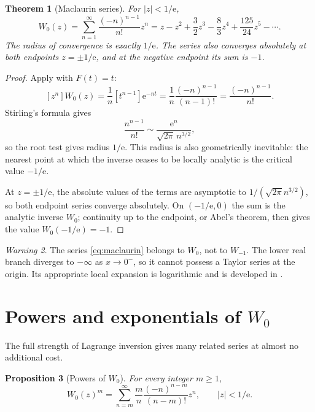 \documentclass[11pt,openany]{book}
\newcommand{\e}{\mathrm{e}}
\newcommand{\Wzero}{W_0}
\newcommand{\abs}[1]{\left|#1\right|}
\theoremstyle{plain}
\newtheorem{theorem}{Theorem}[chapter]
\newtheorem{proposition}[theorem]{Proposition}
\theoremstyle{definition}
\theoremstyle{remark}
\newtheorem{warning}[theorem]{Warning}
\begin{document}
\begin{theorem}[Maclaurin series]\label{thm:maclaurin}
For \(\abs z<1/\e\),
\begin{equation}\label{eq:maclaurin}
 \Wzero(z)=\sum_{n=1}^{\infty}
       \frac{(-n)^{n-1}}{n!}z^n
 =z-z^2+\frac32z^3-\frac83z^4
  +\frac{125}{24}z^5-\cdots.
\end{equation}
The radius of convergence is exactly \(1/\e\).  The series also converges
absolutely at both endpoints \(z=\pm1/\e\), and at the negative endpoint its
sum is \(-1\).
\end{theorem}

\begin{proof}
Apply  with \(F(t)=t\):
\[
 [z^n]\Wzero(z)
 =\frac1n[t^{n-1}]\e^{-nt}
 =\frac1n\frac{(-n)^{n-1}}{(n-1)!}
 =\frac{(-n)^{n-1}}{n!}.
\]
Stirling's formula gives
\[
 \frac{n^{n-1}}{n!}
 \sim\frac{\e^n}{\sqrt{2\pi}\,n^{3/2}},
\]
so the root test gives radius \(1/\e\).  This radius is also geometrically
inevitable: the nearest point at which the inverse ceases to be locally
analytic is the critical value \(-1/\e\).

At \(z=\pm1/\e\), the absolute values of the terms are asymptotic to
\(1/(\sqrt{2\pi}n^{3/2})\), so both endpoint series converge absolutely.  On
\((-1/\e,0)\) the sum is the analytic inverse \(W_0\); continuity up to the
endpoint, or Abel's theorem, then gives the value \(W_0(-1/\e)=-1\).
\end{proof}

\begin{warning}
The series \eqref{eq:maclaurin} belongs to \(W_0\), not to \(W_{-1}\).  The
lower real branch diverges to \(-\infty\) as \(x\to0^-\), so it cannot possess
a Taylor series at the origin.  Its appropriate local expansion is logarithmic
and is developed in .
\end{warning}

\section{Powers and exponentials of \texorpdfstring{\(W_0\)}{W0}}
The full strength of Lagrange inversion gives many related series at almost no
additional cost.

\begin{proposition}[Powers of \(W_0\)]\label{prop:wpowerseries}
For every integer \(m\ge1\),
\begin{equation}\label{eq:wpowerseries}
 \Wzero(z)^m
 =\sum_{n=m}^{\infty}
   \frac{m}{n}\frac{(-n)^{n-m}}{(n-m)!}z^n,
 \qquad \abs z<1/\e.
\end{equation}
\end{proposition}
\end{document}
